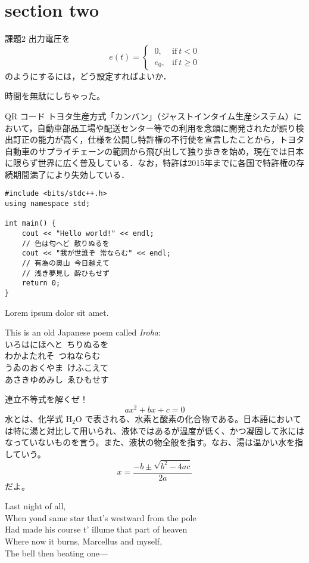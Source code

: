 \section{section two}

\begin{mytbox}{課題2}
	出力電圧を
	\begin{equation*}
		e(t) =
		\begin{cases}
			\ 0,   & \text{if}\ t < 0   \\
			\ e_0, & \text{if}\ t \ge 0
		\end{cases}
	\end{equation*}
	のようにするには，どう設定すればよいか．
\end{mytbox}

{
\kyokasho
時間を無駄にしちゃった。
}

\begin{mybbox}{QR コード}
	トヨタ生産方式「カンバン」（ジャストインタイム生産システム）において，自動車部品工場や配送センター等での利用を念頭に開発されたが誤り検出訂正の能力が高く，仕様を公開し特許権の不行使を宣言したことから，トヨタ自動車のサプライチェーンの範囲から飛び出して独り歩きを始め，現在では日本に限らず世界に広く普及している．なお，特許は2015年までに各国で特許権の存続期間満了により失効している．
\end{mybbox}

\begin{verbatim}
#include <bits/stdc++.h>
using namespace std;

int main() {
	cout << "Hello world!" << endl;
	// 色は匂へど 散りぬるを
	cout << "我が世誰ぞ 常ならむ" << endl;
	// 有為の奥山 今日越えて
	// 浅き夢見し 酔ひもせず
	return 0;
}
\end{verbatim}

Lorem ipsum dolor sit amet.

This is an old Japanese poem called \emph{Iroha}: \\
いろはにほへと\ ちりぬるを \\
わかよたれそ\ つねならむ \\
うゐのおくやま\ けふこえて \\
あさきゆめみし\ ゑひもせす

連立不等式を解くぜ！
\begin{equation}
	ax^2 + bx + c = 0
\end{equation}
水とは、化学式 \(\textrm{H}_2\textrm{O}\) で表される、水素と酸素の化合物である。日本語においては特に湯と対比して用いられ、液体ではあるが温度が低く、かつ凝固して氷にはなっていないものを言う。また、液状の物全般を指す。なお、湯は温かい水を指していう。
\begin{equation}
	x = \frac{-b \pm \sqrt{b^2 - 4ac}}{2a}
\end{equation}
だよ。

Last night of all, \\
When yond same star that's westward from the pole \\
Had made his course t' illume that part of heaven \\
Where now it burns, Marcellus and myself, \\
The bell then beating one—
